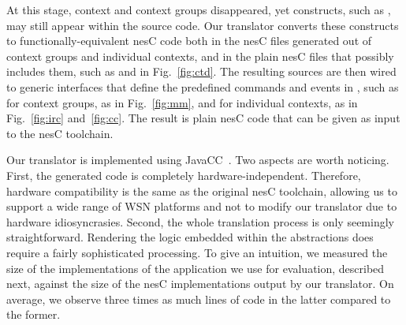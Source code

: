 At this stage, context and context groups disappeared, yet \conesc
constructs, such as , may still appear within the
source code. Our translator converts these constructs to
functionally-equivalent nesC code both in the nesC files generated out
of context groups and individual contexts, and in the plain nesC files
that possibly includes them, such as  and  in
Fig.~\ref{fig:ctd}. The resulting sources are then wired to generic
interfaces that define the predefined commands and events in \conesc,
such as  for context groups, as in
Fig.~\ref{fig:mm}, and  for individual
contexts, as in Fig.~\ref{fig:irc} and~\ref{fig:cc}. The result is
plain nesC code that can be given as input to the nesC toolchain.




Our translator is implemented using JavaCC~\cite{javacc}. Two aspects
are worth noticing. First, the generated code is completely
hardware-independent. Therefore, hardware compatibility is the same as
the original nesC toolchain, allowing us to support a wide range of
WSN platforms and not to modify our translator due to hardware
idiosyncrasies. Second, the whole translation process is only
seemingly straightforward. Rendering the logic embedded within the
\conesc abstractions does require a fairly sophisticated
processing. To give an intuition, we measured the size of the \conesc
implementations of the application we use for evaluation, described
next, against the size of the nesC implementations output by our
translator. On average, we observe three times as much lines of code
in the latter compared to the former.

